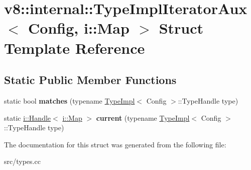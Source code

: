 \hypertarget{structv8_1_1internal_1_1_type_impl_iterator_aux_3_01_config_00_01i_1_1_map_01_4}{}\section{v8\+:\+:internal\+:\+:Type\+Impl\+Iterator\+Aux$<$ Config, i\+:\+:Map $>$ Struct Template Reference}
\label{structv8_1_1internal_1_1_type_impl_iterator_aux_3_01_config_00_01i_1_1_map_01_4}
\subsection*{Static Public Member Functions}
\begin{DoxyCompactItemize}
\item 
\hypertarget{structv8_1_1internal_1_1_type_impl_iterator_aux_3_01_config_00_01i_1_1_map_01_4_a29c4c46b2ced58676f4005c76e532da7}{}static bool {\bfseries matches} (typename \hyperlink{classv8_1_1internal_1_1_type_impl}{Type\+Impl}$<$ Config $>$\+::Type\+Handle type)\label{structv8_1_1internal_1_1_type_impl_iterator_aux_3_01_config_00_01i_1_1_map_01_4_a29c4c46b2ced58676f4005c76e532da7}

\item 
\hypertarget{structv8_1_1internal_1_1_type_impl_iterator_aux_3_01_config_00_01i_1_1_map_01_4_a431823831e20d03e36f2ec2ff710067e}{}static \hyperlink{classv8_1_1internal_1_1_handle}{i\+::\+Handle}$<$ \hyperlink{classv8_1_1internal_1_1_map}{i\+::\+Map} $>$ {\bfseries current} (typename \hyperlink{classv8_1_1internal_1_1_type_impl}{Type\+Impl}$<$ Config $>$\+::Type\+Handle type)\label{structv8_1_1internal_1_1_type_impl_iterator_aux_3_01_config_00_01i_1_1_map_01_4_a431823831e20d03e36f2ec2ff710067e}

\end{DoxyCompactItemize}


The documentation for this struct was generated from the following file\+:\begin{DoxyCompactItemize}
\item 
src/types.\+cc\end{DoxyCompactItemize}
